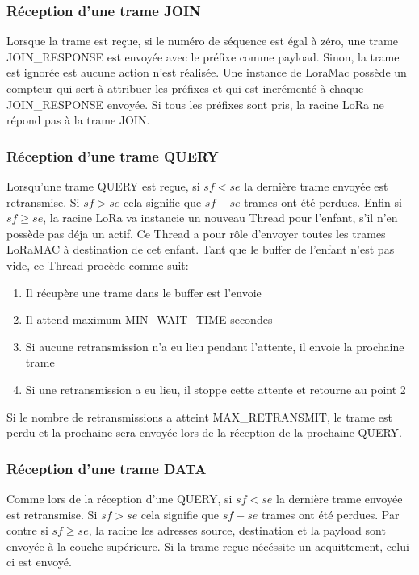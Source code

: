     
    \subsubsection*{Réception d'une trame JOIN}
    Lorsque la trame est reçue, si le numéro de séquence est égal à zéro, une trame 
    JOIN\_RESPONSE est envoyée avec le préfixe comme payload. Sinon, la trame est ignorée est 
    aucune action n'est réalisée. Une instance de LoraMac possède un compteur qui sert à attribuer 
    les préfixes et qui est incrémenté à chaque JOIN\_RESPONSE envoyée. Si tous les préfixes sont pris, la racine LoRa ne répond pas à la trame JOIN.

    \subsubsection*{Réception d'une trame QUERY}
    Lorsqu'une trame QUERY est reçue, si $sf < se$ la dernière trame envoyée est retransmise. Si
    $sf > se$ cela signifie que $sf-se$ trames ont été perdues. Enfin si $sf \geq se$, la racine LoRa va instancie un nouveau Thread pour l'enfant, s'il n'en possède pas déja un actif. Ce Thread a pour rôle d'envoyer toutes les trames LoRaMAC à destination de cet enfant.
    Tant que le buffer de l'enfant n'est pas vide, ce Thread procède comme suit:
    \begin{enumerate}
        \item Il récupère une trame dans le buffer est l'envoie
        \item Il attend maximum MIN\_WAIT\_TIME secondes
        \item Si aucune retransmission n'a eu lieu pendant l'attente, il envoie la prochaine trame
        \item Si une retransmission a eu lieu, il stoppe cette attente et retourne au point 2
    \end{enumerate}

    Si le nombre de retransmissions a atteint MAX\_RETRANSMIT, le trame est perdu et la prochaine sera envoyée lors de la réception de la prochaine QUERY.

    \subsubsection*{Réception d'une trame DATA}
        Comme lors de la réception d'une QUERY, si $sf < se$ la dernière trame envoyée est retransmise. Si $sf > se$ cela signifie que $sf-se$ trames ont été perdues. Par contre si $sf \geq se$, la racine les adresses source, destination et la payload sont envoyée à la couche supérieure. Si la trame reçue nécéssite un acquittement, celui-ci est envoyé.


